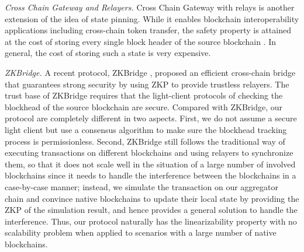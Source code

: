 \smallskip\noindent\emph{Cross Chain Gateway and Relayers.}
Cross Chain Gateway with relays is another extension of the idea of state pinning. While it enables blockchain interoperability applications including cross-chain token transfer, the safety property is attained at the cost of storing every single block header of the source blockchain \cite{belchior2021survey}. In general, the cost of storing such a state is very expensive.

\smallskip\noindent\emph{ZKBridge.}
A recent protocol, ZKBridge \cite{xie2022zkbridge-zkbridge}, proposed an efficient cross-chain bridge that guarantees strong security by using ZKP to provide trustless relayers. The trust base of ZKBridge requires that the light-client protocols of checking the blockhead of the source blockchain are secure. Compared with ZKBridge, our protocol are completely different in two aspects. First, we do not assume a secure light client but use a consensus algorithm to make sure the blockhead tracking process is permissionless. Second, ZKBridge still follows the traditional way of executing transactions on different blockchains and using relayers to synchronize them, so that it does not scale well in the situation of a large number of involved blockchains since it needs to handle the interference between the blockchains in a case-by-case manner; instead, we simulate the transaction on our aggregator chain and convince native blockchains to update their local state by providing the ZKP of the simulation result, and hence provides a general solution to handle the interference. Thus, our protocol naturally has the linearizability property with no scalability  problem when applied to scenarios with a large number of native blockchains.

